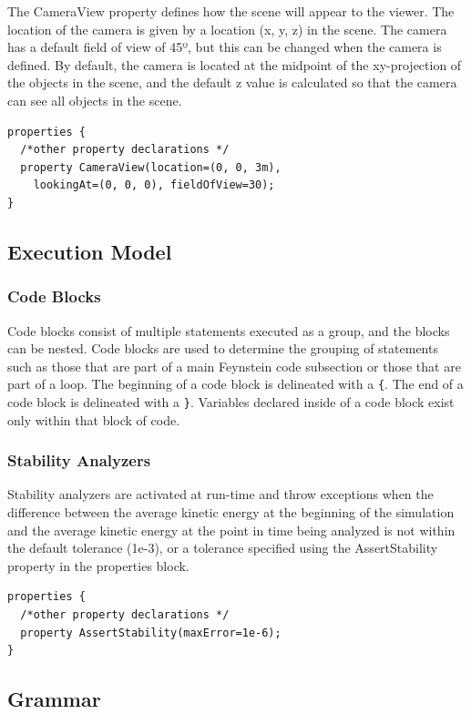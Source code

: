 The CameraView property defines how the scene will appear to the
viewer. The location of the camera is given by a location (x, y, z) in
the scene. The camera has a default field of view of 45º, but this can
be changed when the camera is defined. By default, the camera is
located at the midpoint of the xy-projection of the objects in the
scene, and the default z value is calculated so that the camera can
see all objects in the scene.

\begin{verbatim}
properties {
  /*other property declarations */
  property CameraView(location=(0, 0, 3m), 
    lookingAt=(0, 0, 0), fieldOfView=30);
}
\end{verbatim}

\subsection{Execution Model}

\subsubsection{Code Blocks}
Code blocks consist of multiple statements executed as a group, and
the blocks can be nested. Code blocks are used to determine the
grouping of statements such as those that are part of a main Feynstein
code subsection or those that are part of a loop. The beginning of a code
block is delineated with a \texttt{\{}. The end of a code block is delineated
with a \texttt{\}}. Variables declared inside of a code block exist only
within that block of code.

\subsubsection{Stability Analyzers}

Stability analyzers are activated at run-time and throw exceptions
when the difference between the average kinetic energy at the
beginning of the simulation and the average kinetic energy at the
point in time being analyzed is not within the default tolerance
(1e-3), or a tolerance specified using the AssertStability property in
the properties block.

\begin{verbatim}
properties {
  /*other property declarations */
  property AssertStability(maxError=1e-6);
}
\end{verbatim}

\subsection{Grammar}

